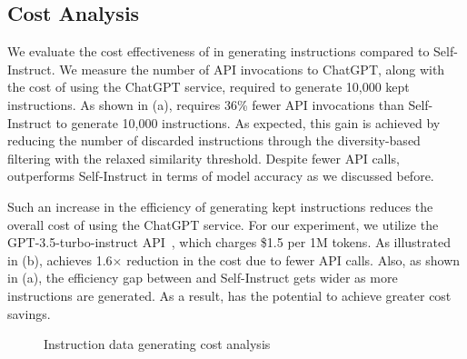 \subsection{Cost Analysis}

\begin{comment}
\cancel{
We evaluate the efficiency of \ours{} in generating instructions compared to
Self-Instruct method. The experiment measured the number of API requests sent
and the API cost to generate 10,000 kept instructions, meaning instructions that 
passed the filtering process. As shown in \FIG{fig:filtering-eval}(a), \ours{} 
demonstrates an improvement in efficiency by requiring fewer API requests to generate 
the 10,000 instructions. This efficiency gain is achieved by reducing the number of 
discarded instructions. Notably, as shown in previous experiments, this less strict 
filtering approach does not negatively impact model training, as it maintains the 
diversity of the batch configuration.
}
\end{comment}

We evaluate the cost effectiveness of \ours{} in generating instructions 
compared to Self-Instruct. We measure the number of API invocations to
ChatGPT, along with the cost of using the ChatGPT service,
required to generate 10,000 kept instructions.
As shown in (a), \ours{} 
requires 36\% fewer API invocations than Self-Instruct to
generate 10,000 instructions.
As expected, this gain is achieved by reducing the number of 
discarded instructions through the diversity-based filtering with the relaxed similarity threshold.
Despite fewer API calls, \ours{} outperforms Self-Instruct 
in terms of model accuracy as we discussed before.


Such an increase in the efficiency of generating kept instructions 
reduces the overall cost of using the ChatGPT service.
For our experiment, 
we utilize the GPT-3.5-turbo-instruct API~\cite{gpt3.5-api}, 
which charges \$1.5 per 1M tokens. 
As illustrated in (b), 
\ours{} achieves 1.6$\times$ reduction in the cost 
due to fewer API calls.
Also, as shown in (a), 
the efficiency gap between \ours{} and
Self-Instruct gets wider as more instructions are generated. 
As a result, \ours{} has the potential to achieve greater cost savings.


\begin{figure}[t]%
	\centering
	\caption{Instruction data generating cost analysis}%
	\label{fig:filtering-eval}%
\end{figure}